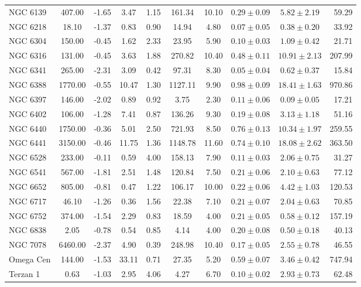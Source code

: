 \documentclass[doublespace,nopageskip]{VTthesis} %
\begin{document}
\begin{table}
\begin{threeparttable}
\begin{tabular}{lccccccccr}
NGC 6139 & 407.00 & -1.65 & 3.47 & 1.15 & 161.34 & 10.10 & $0.29 \pm 0.09$ & $5.82 \pm 2.19$ & 59.29\\
NGC 6218 & 18.10 & -1.37 & 0.83 & 0.90 & 14.94 & 4.80 & $0.07 \pm 0.05$ & $0.38 \pm 0.20$ & 33.92\\
NGC 6304 & 150.00 & -0.45 & 1.62 & 2.33 & 23.95 & 5.90 & $0.10 \pm 0.03$ & $1.09 \pm 0.42$ & 21.71\\
NGC 6316 & 131.00 & -0.45 & 3.63 & 1.88 & 270.82 & 10.40 & $0.48 \pm 0.11$ & $10.91 \pm 2.13$ & 207.99\\
NGC 6341 & 265.00 & -2.31 & 3.09 & 0.42 & 97.31 & 8.30 & $0.05 \pm 0.04$ & $0.62 \pm 0.37$ & 15.84\\
NGC 6388 & 1770.00 & -0.55 & 10.47 & 1.30 & 1127.11 & 9.90 & $0.98 \pm 0.09$ & $18.41 \pm 1.63$ & 970.86\\
NGC 6397 & 146.00 & -2.02 & 0.89 & 0.92 & 3.75 & 2.30 & $0.11 \pm 0.06$ & $0.09 \pm 0.05$ & 17.21\\
NGC 6402 & 106.00 & -1.28 & 7.41 & 0.87 & 136.26 & 9.30 & $0.19 \pm 0.08$ & $3.13 \pm 1.18$ & 51.16\\
NGC 6440 & 1750.00 & -0.36 & 5.01 & 2.50 & 721.93 & 8.50 & $0.76 \pm 0.13$ & $10.34 \pm 1.97$ & 259.55\\
NGC 6441 & 3150.00 & -0.46 & 11.75 & 1.36 & 1148.78 & 11.60 & $0.74 \pm 0.10$ & $18.08 \pm 2.62$ & 363.50\\
NGC 6528 & 233.00 & -0.11 & 0.59 & 4.00 & 158.13 & 7.90 & $0.11 \pm 0.03$ & $2.06 \pm 0.75$ & 31.27\\
NGC 6541 & 567.00 & -1.81 & 2.51 & 1.48 & 120.84 & 7.50 & $0.21 \pm 0.06$ & $2.10 \pm 0.63$ & 77.12\\
NGC 6652 & 805.00 & -0.81 & 0.47 & 1.22 & 106.17 & 10.00 & $0.22 \pm 0.06$ & $4.42 \pm 1.03$ & 120.53\\
NGC 6717 & 46.10 & -1.26 & 0.36 & 1.56 & 22.38 & 7.10 & $0.21 \pm 0.07$ & $2.04 \pm 0.63$ & 70.85\\
NGC 6752 & 374.00 & -1.54 & 2.29 & 0.83 & 18.59 & 4.00 & $0.21 \pm 0.05$ & $0.58 \pm 0.12$ & 157.19\\
NGC 6838 & 2.05 & -0.78 & 0.54 & 0.85 & 4.14 & 4.00 & $0.20 \pm 0.08$ & $0.50 \pm 0.18$ & 40.13\\
NGC 7078 & 6460.00 & -2.37 & 4.90 & 0.39 & 248.98 & 10.40 & $0.17 \pm 0.05$ & $2.55 \pm 0.78$ & 46.55\\
Omega Cen & 144.00 & -1.53 & 33.11 & 0.71 & 27.35 & 5.20 & $0.59 \pm 0.07$ & $3.46 \pm 0.42$ & 747.94\\
Terzan 1 & 0.63 & -1.03 & 2.95 & 4.06 & 4.27 & 6.70 & $0.10 \pm 0.02$ & $2.93 \pm 0.73$ & 62.48\\

\end{tabular}
\end{threeparttable}
\end{table}
\end{document}
